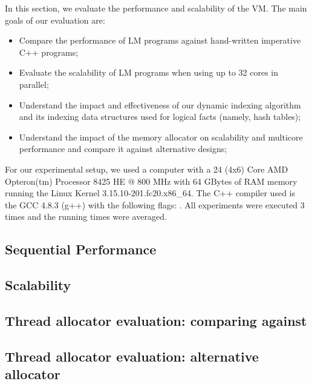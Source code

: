 In this section, we evaluate the performance and scalability of the VM. The main
goals of our evaluation are:

\begin{itemize}
   \item Compare the performance of LM programs against hand-written
      imperative C++ programs;
   \item Evaluate the scalability of LM programs when using up to 32 cores
      in parallel;
   \item Understand the impact and effectiveness of our dynamic indexing
      algorithm and its indexing data structures used for logical facts (namely,
      hash tables);
   \item Understand the impact of the memory allocator on scalability and
      multicore performance and compare it against alternative designs;
\end{itemize}

For our experimental setup, we used a computer with a 24 (4x6) Core AMD
Opteron(tm) Processor 8425 HE $@$ 800 MHz with 64 GBytes of RAM memory running
the Linux Kernel 3.15.10-201.fc20.x86\_64. The C++ compiler used is the GCC
4.8.3 (g++) with the following  flags: .  All experiments were executed 3 times and the running times
were averaged.

\subsection{Sequential Performance}\label{section:implementation:performance}


\subsection{Scalability}


\clearpage

\subsection{Thread allocator evaluation: comparing against }


\subsection{Thread allocator evaluation: alternative allocator}\label{section:implementation:alternative_allocator}

